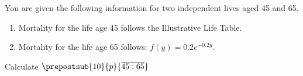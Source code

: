 You are given the following information for two independent lives aged 45 and 65.
\begin{enumerate}
  \item Mortality for the life age 45 follows the Illustrative Life Table.
  \item Mortality for the life age 65 follows: $f(y)=0.2e^{-0.2y}$.
\end{enumerate}
Calculate $\prepostsub{10}{p}{\overline{45:65}}$
